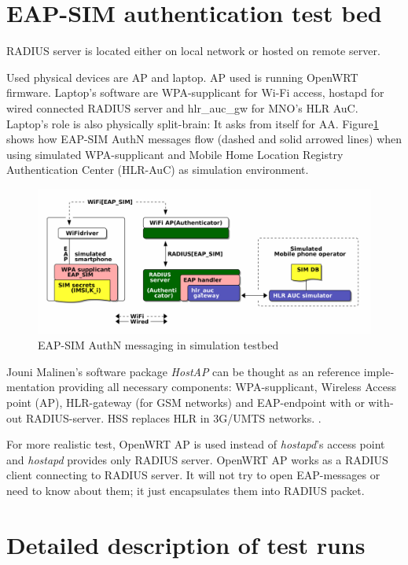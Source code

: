 \documentclass[12pt,a4paper,english]{tutthesis}
\begin{document}
\begin{otherlanguage}{english}
\section{EAP-SIM authentication test bed}
\label{sec-5-1}
RADIUS server is located either on local network or hosted on remote
server.

Used physical devices are AP and laptop.  AP used is running OpenWRT
firmware.  Laptop's software are WPA-supplicant for Wi-Fi access,
hostapd for wired connected RADIUS server and hlr\_auc\_gw for MNO's
HLR AuC. Laptop's role is also physically split-brain: It asks from itself for AA. 
Figure\ref{eap-sim-testbed} shows how EAP-SIM AuthN messages flow (dashed
and solid arrowed lines) when using 
simulated WPA-supplicant and Mobile Home Location Registry Authentication Center (HLR-AuC) as simulation environment.

\begin{figure}[htb]
\centering
\includegraphics[width=.9\linewidth]{demoinfra.png}
\caption{\label{eap-sim-testbed}EAP-SIM AuthN messaging in simulation testbed}
\end{figure}




Jouni Malinen's software package \emph{HostAP} can be thought as an reference
implementation providing all necessary components: WPA-supplicant, Wireless
Access point (AP), HLR-gateway (for GSM networks) and EAP-endpoint with
or without RADIUS-server. HSS replaces HLR in 3G/UMTS networks.
\cite{hostapd}.

For more realistic test, OpenWRT AP is used instead of \emph{hostapd}'s
access point and \emph{hostapd} provides only RADIUS server.
OpenWRT AP works as a RADIUS client connecting to RADIUS server. 
It will not try to open EAP-messages or need
to know about them; it just encapsulates them into RADIUS packet.

\section{Detailed description of test runs}
\label{sec-5-2}




\end{otherlanguage}
\end{document}
